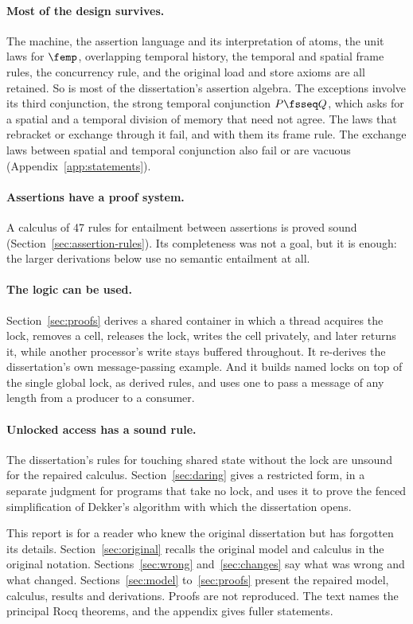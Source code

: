\paragraph{Most of the design survives.}
The machine, the assertion language and its interpretation of atoms, the
unit laws for $\femp$, overlapping temporal history, the temporal and
spatial frame rules, the concurrency rule, and the original load and store
axioms are all retained. So is most of the dissertation's assertion
algebra. The exceptions involve its third conjunction, the strong temporal
conjunction $P \fsseq Q$, which asks for a spatial and a temporal division
of memory that need not agree. The laws that rebracket or exchange through
it fail, and with them its frame rule. The exchange laws between spatial
and temporal conjunction also fail or are vacuous
(Appendix~\ref{app:statements}).

\paragraph{Assertions have a proof system.}
A calculus of 47 rules for entailment between assertions is proved sound
(Section~\ref{sec:assertion-rules}). Its completeness was not a goal, but it
is enough: the larger derivations below use no semantic entailment at all.

\paragraph{The logic can be used.}
Section~\ref{sec:proofs} derives a shared container in which a thread
acquires the lock, removes a cell, releases the lock, writes the cell
privately, and later returns it, while another processor's write stays
buffered throughout. It re-derives the dissertation's own message-passing
example. And it builds named locks on top of the single global lock, as
derived rules, and uses one to pass a message of any length from a producer
to a consumer.

\paragraph{Unlocked access has a sound rule.}
The dissertation's rules for touching shared state without the lock are
unsound for the repaired calculus. Section~\ref{sec:daring} gives a
restricted form, in a separate judgment for programs that take no lock, and
uses it to prove the fenced simplification of Dekker's algorithm with
which the dissertation opens.

\medskip
This report is for a reader who knew the original dissertation but has
forgotten its details. Section~\ref{sec:original} recalls the original model
and calculus in the original notation. Sections~\ref{sec:wrong}
and~\ref{sec:changes} say what was wrong and what changed.
Sections~\ref{sec:model} to~\ref{sec:proofs} present the repaired model,
calculus, results and derivations. Proofs are not reproduced. The text
names the principal Rocq theorems, and the appendix gives fuller
statements.
